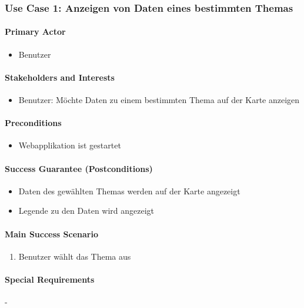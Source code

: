 \subsubsection{Use Case 1: Anzeigen von Daten eines bestimmten Themas}
\paragraph{Primary Actor}
\begin{itemize}
\item Benutzer
\end{itemize}

\paragraph{Stakeholders and Interests}
\begin{itemize}
\item Benutzer: Möchte Daten zu einem bestimmten Thema auf der Karte anzeigen
\end{itemize}

\paragraph{Preconditions}
\begin{itemize}
\item Webapplikation ist gestartet
\end{itemize}

\paragraph{Success Guarantee (Postconditions)}
\begin{itemize}
\item Daten des gewählten Themas werden auf der Karte angezeigt
\item Legende zu den Daten wird angezeigt
\end{itemize}

\paragraph{Main Success Scenario}
\begin{enumerate}
\item Benutzer wählt das Thema aus
\end{enumerate}

\paragraph{Special Requirements}
-

